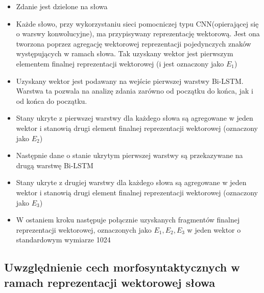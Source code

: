 \begin{itemize}
    \item Zdanie jest dzielone na słowa
    \item Każde słowo, przy wykorzystaniu sieci pomocniczej typu CNN(opierającej się o warswy konwolucyjne), ma przypisywany reprezentację wektorową. Jest ona tworzona poprzez agregację wektorowej reprezentacji pojedynczych znaków występujących w ramach słowa. Tak uzyskany wektor jest pierwszym elementem finalnej reprezentacji wektorowej (i jest oznaczony jako $E_1$)
    \item Uzyskany wektor jest podawany na wejście pierwszej warstwy Bi-LSTM. Warstwa ta pozwala na analizę zdania zarówno od początku do końca, jak i od końca do początku.
    \item  Stany ukryte z pierwszej warstwy dla każdego słowa są agregowane w jeden wektor i stanowią drugi element finalnej reprezentacji wektorowej (oznaczony jako $E_2$)
    \item Następnie dane o stanie ukrytym pierwszej warstwy są przekazywane na drugą warstwę Bi-LSTM
    \item Stany ukryte z drugiej warstwy dla każdego słowa są agregowane w jeden wektor i stanowią drugi element finalnej reprezentacji wektorowej (oznaczony jako $E_3$)
    \item W ostaniem kroku następuje połącznie uzyskanych fragmentów finalnej reprezentacji wektorowej, oznaczonych jako $E_1,E_2, E_3$ w jeden wektor o standardowym wymiarze 1024
\end{itemize}





\subsection{Uwzględnienie cech morfosyntaktycznych w ramach reprezentacji wektorowej słowa}


